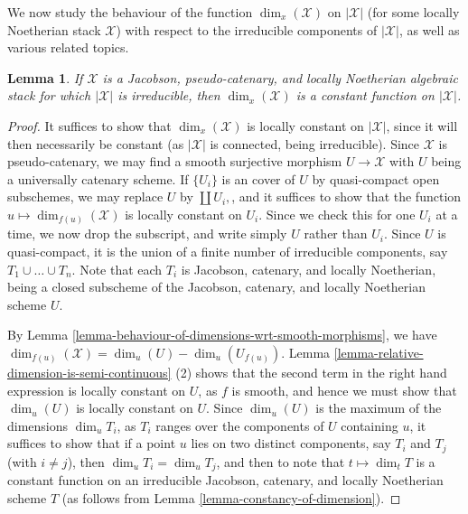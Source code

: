 \documentclass{stacks-project}
\theoremstyle{plain}
\newtheorem{lemma}[subsection]{Lemma}
\theoremstyle{definition}
\theoremstyle{remark}
\numberwithin{equation}{subsection}
\begin{document}
\noindent
We now study the behaviour of the function $\dim_x(\mathcal{X})$ on
$|\mathcal{X}|$
(for some locally Noetherian stack $\mathcal{X}$) with respect to the
irreducible
components of $|\mathcal{X}|$, as well as various
related topics.

\begin{lemma}
\label{lemma-irreducible-implies-equidimensional}
If $\mathcal{X}$ is
a Jacobson, pseudo-catenary, and locally Noetherian  algebraic stack
for which $|\mathcal{X}|$ is irreducible,
then $\dim_x(\mathcal{X})$ is a constant function on $|\mathcal{X}|$.
\end{lemma}

\begin{proof}
It suffices to show that $\dim_x(\mathcal{X})$ is locally constant on
$|\mathcal{X}|$,
since it will then necessarily be constant (as $|\mathcal{X}|$ is connected,
being irreducible).  Since $\mathcal{X}$ is pseudo-catenary,
we may find a smooth surjective morphism $U \to \mathcal{X}$ with $U$
being a universally catenary scheme.  If $\{U_i\}$ is an
cover of $U$ by quasi-compact open subschemes, we may replace
$U$ by $\coprod U_i,$, and
it suffices to show that
the function $u \mapsto \dim_{f(u)}(\mathcal{X})$ is locally constant on $U_i$.
Since we check this for one $U_i$ at a time, we now drop the subscript,
and write simply $U$ rather than $U_i$.
Since $U$ is quasi-compact, it
is the union of a finite number of irreducible components,
say $T_1 \cup \ldots \cup T_n$.  Note that each $T_i$ is Jacobson,
catenary, and locally Noetherian,
being a closed subscheme of the Jacobson, catenary, and locally Noetherian
scheme $U$.

\medskip\noindent
By Lemma \ref{lemma-behaviour-of-dimensions-wrt-smooth-morphisms}, we have
$\dim_{f(u)}(\mathcal{X}) = \dim_{u}(U) - \dim_{u}(U_{f(u)}).$
Lemma \ref{lemma-relative-dimension-is-semi-continuous} (2)
shows that the second term in the right hand expression is locally
constant on $U$, as $f$ is smooth,
and hence we must show that $\dim_u(U)$
is locally constant on $U$.  Since $\dim_u(U)$ is the maximum
of the dimensions $\dim_u T_i$, as $T_i$ ranges over the components
of $U$ containing $u$, it suffices to show
that if a point $u$ lies on two distinct components,
say $T_i$ and $T_j$ (with $i \neq j$),
then $\dim_u T_i = \dim_u T_j$,
and then to note that $t\mapsto \dim_t T$ is a constant
function on an irreducible Jacobson,
catenary, and locally Noetherian scheme $T$
(as follows from Lemma \ref{lemma-constancy-of-dimension}).


\end{proof}
\end{document}

